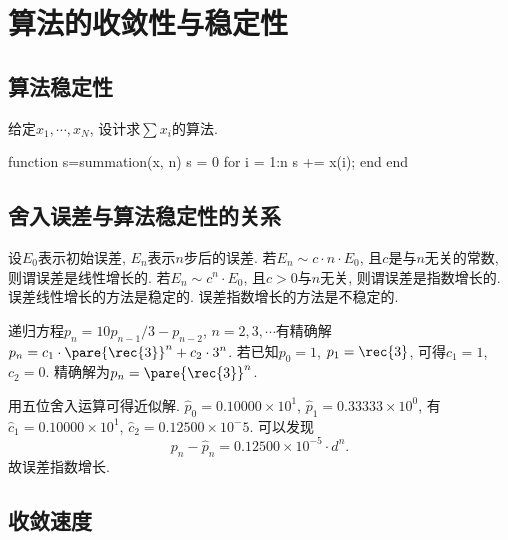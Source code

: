 \documentclass[hidelinks]{ctexart}
\begin{document}
\section{算法的收敛性与稳定性} %
\label{sec:算法的收敛性与稳定性}

\subsection{算法稳定性} %
\label{sub:算法稳定性}

\begin{ex}
    给定$x_1, \cdots, x_N$, 设计求$\sum x_i$的算法.
    \begin{matlablst}
function s=summation(x, n)
    s = 0
    for i = 1:n
        s += x(i);
    end
end
    \end{matlablst}
\end{ex}


\subsection{舍入误差与算法稳定性的关系} %
\label{sub:舍入误差与算法稳定性的关系}

设$E_0$表示初始误差, $E_n$表示$n$步后的误差.
\newpoint{}若$E_n \sim c\cdot n\cdot E_0$, 且$c$是与$n$无关的常数, 则谓误差是线性增长的.
\newpoint{}若$E_n \sim c^n \cdot E_0$, 且$c>0$与$n$无关, 则谓误差是指数增长的.
\newpoint{}误差线性增长的方法是稳定的. 误差指数增长的方法是不稳定的.
\begin{ex}
    递归方程$p_n = 10p_{n-1}/3 - p_{n-2}$, $n = 2,3,\cdots$有精确解$p_n = \displaystyle c_1 \cdot \pare{\rec{3}}^n + c_2\cdot 3^n$. 若已知$p_0 = 1$, $p_1 = \displaystyle \rec{3}$, 可得$c_1 = 1$, $c_2 = 0$. 精确解为$\displaystyle p_n = \pare{\rec{3}}^n$.
    \par
    用五位舍入运算可得近似解. $\hat{p}_0 = 0.10000\times 10^1$, $\hat p_1 = 0.33333\times 10^0$, 有$\hat c_1 = 0.10000\times 10^1$, $\hat c_2 = 0.12500 \times 10^-5$. 可以发现
    \[ p_n - \hat p_n = 0.12500\times 10^{-5}\cdot d^n. \]
    故误差指数增长.
\end{ex}


\subsection{收敛速度} %
\label{sub:收敛速度}
\end{document}
